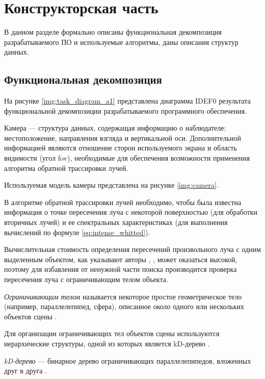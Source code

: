 \chapter{Конструкторская часть}

В данном разделе формально описаны функциональная декомпозиция разрабатываемого ПО и используемые алгоритмы, даны описания структур данных.

\section{Функциональная декомпозиция}

На рисунке \ref{img:task_diagram_a1} представлена диаграмма IDEF0 результата функциональной декомпозиции разрабатываемого программного обеспечения.


Камера --- структура данных, содержащая информацию о наблюдателе: местоположение, направления взгляда и вертикальной оси.
Дополнительной информацией являются отношение сторон используемого экрана и область видимости (угол fov), необходимые для обеспечения возможности применения алгоритма обратной трассировки лучей.

Используемая модель камеры представлена на рисунке \ref{img:camera}.



В алгоритме обратной трассировки лучей необходимо, чтобы была известна информация о точке пересечения луча с некоторой поверхностью (для обработки вторичных лучей) и ее спектральных характеристиках (для выполнения вычислений по формуле \ref{eq:intense_whitted}).

Вычислительная стоимость определения пересечений произвольного луча с одним выделенным объектом, как указывают авторы \cite{роджерс}, \cite{боресков}, может оказаться высокой, поэтому для избавления от ненужной части поиска производится проверка пересечения луча с ограничивающим телом объекта.

\textit{Ограничивающим телом} называется некоторое простое геометрическое тело (например, параллелепипед, сфера), описанное около одного или нескольких объектов сцены \cite{боресков}.

Для организации ограничивающих тел объектов сцены используются иерархические структуры, одной из которых является kD-дерево \cite{боресков}.

\textit{kD-дерево} --- бинарное дерево ограничивающих параллелепипедов, вложенных друг в друга \cite{боресков}.

